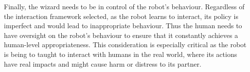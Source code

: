 \documentclass[manuscript, review, anonymous]{acmart}
\newcommand{\ES}[1]{\added[id=ES]{#1}}
\newcommand{\woz}{WoZ++\xspace}
\begin{document}
Finally, the wizard needs to be in control of the robot's behaviour. Regardless
of the interaction framework selected, as the robot learns to interact, its
policy is imperfect and would lead to inappropriate behaviour.  Thus the human
needs to have oversight on the robot's behaviour to ensure that it constantly
achieves a human-level appropriateness. This consideration is especially
critical as the robot is being to taught to interact with humans in the real
world, where its actions have real impacts and might cause harm or distress to
its partner. 


%
%	

\end{document}
